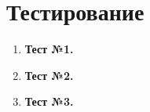 \documentclass[12pt]{article}
\begin{document}
\newpage


\section*{Тестирование}

\begin{enumerate}

\item \textbf{Тест №1.}




\item \textbf{Тест №2.}




\item \textbf{Тест №3.}



\end{enumerate}
\end{document}
